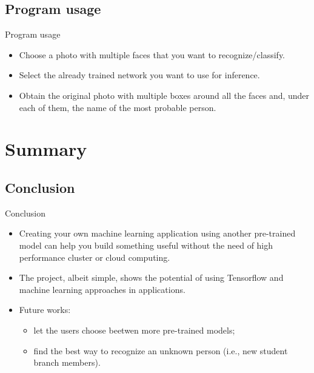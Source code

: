 \documentclass{beamer}
\begin{document}
\subsection{Program usage}
\begin{frame}{Program usage}
\begin{itemize}
		\setlength\itemsep{1em}
		[triangle]
		
			\item 
				Choose a photo with multiple faces that you want to recognize/classify.
			\item 
				Select the already trained network you want to use for inference.
			\item
				Obtain the original photo with multiple boxes around all the faces and, under each of them, the name of the most probable person.
		
	\end{itemize}
\end{frame}




\section{Summary}

\subsection{Conclusion}
\begin{frame}{Conclusion}
	\begin{itemize}
	\setlength\itemsep{1em}
	[triangle]
	\item 
		Creating your own machine learning application using another pre-trained model can help you build 					something useful without the need of high performance cluster or cloud computing.
	\item 
		The project, albeit simple, shows the potential of using Tensorflow and machine learning approaches in applications.
	\item
		Future works:
	\begin{itemize}
				[circle]
    				\item
      					let the users choose beetwen more pre-trained models;
    				\item    
      					find the best way to recognize an unknown person (i.e., new student branch members).
 
			\end{itemize}
		
	\end{itemize}
\end{frame}
\end{document}
